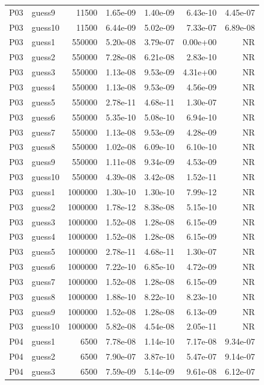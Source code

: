 {\begin{longtable}{llrrrrr}
P03 & guess9 & 11500 & 1.65e-09 & 1.40e-09 & 6.43e-10 & 4.45e-07 \\
P03 & guess10 & 11500 & 6.44e-09 & 5.02e-09 & 7.33e-07 & 6.89e-08 \\
P03 & guess1 & 550000 & 5.20e-08 & 3.79e-07 & 0.00e+00 & NR \\
P03 & guess2 & 550000 & 7.28e-08 & 6.21e-08 & 2.83e-10 & NR \\
P03 & guess3 & 550000 & 1.13e-08 & 9.53e-09 & 4.31e+00 & NR \\
P03 & guess4 & 550000 & 1.13e-08 & 9.53e-09 & 4.56e-09 & NR \\
P03 & guess5 & 550000 & 2.78e-11 & 4.68e-11 & 1.30e-07 & NR \\
P03 & guess6 & 550000 & 5.35e-10 & 5.08e-10 & 6.94e-10 & NR \\
P03 & guess7 & 550000 & 1.13e-08 & 9.53e-09 & 4.28e-09 & NR \\
P03 & guess8 & 550000 & 1.02e-08 & 6.09e-10 & 6.10e-10 & NR \\
P03 & guess9 & 550000 & 1.11e-08 & 9.34e-09 & 4.53e-09 & NR \\
P03 & guess10 & 550000 & 4.39e-08 & 3.42e-08 & 1.52e-11 & NR \\
P03 & guess1 & 1000000 & 1.30e-10 & 1.30e-10 & 7.99e-12 & NR \\
P03 & guess2 & 1000000 & 1.78e-12 & 8.38e-08 & 5.15e-10 & NR \\
P03 & guess3 & 1000000 & 1.52e-08 & 1.28e-08 & 6.15e-09 & NR \\
P03 & guess4 & 1000000 & 1.52e-08 & 1.28e-08 & 6.15e-09 & NR \\
P03 & guess5 & 1000000 & 2.78e-11 & 4.68e-11 & 1.30e-07 & NR \\
P03 & guess6 & 1000000 & 7.22e-10 & 6.85e-10 & 4.72e-09 & NR \\
P03 & guess7 & 1000000 & 1.52e-08 & 1.28e-08 & 6.15e-09 & NR \\
P03 & guess8 & 1000000 & 1.88e-10 & 8.22e-10 & 8.23e-10 & NR \\
P03 & guess9 & 1000000 & 1.52e-08 & 1.28e-08 & 6.13e-09 & NR \\
P03 & guess10 & 1000000 & 5.82e-08 & 4.54e-08 & 2.05e-11 & NR \\
P04 & guess1 & 6500 & 7.78e-08 & 1.14e-10 & 7.17e-08 & 9.34e-07 \\
P04 & guess2 & 6500 & 7.90e-07 & 3.87e-10 & 5.47e-07 & 9.14e-07 \\
P04 & guess3 & 6500 & 7.59e-09 & 5.14e-09 & 9.61e-08 & 6.12e-07 \\

\end{longtable}}
